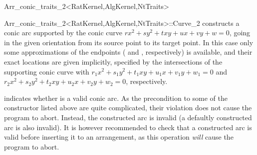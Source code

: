 \begin{ccRefClass}{Arr_conic_traits_2<RatKernel,AlgKernel,NtTraits>}
\begin{ccClass}{Arr_conic_traits_2<RatKernel,AlgKernel,NtTraits>::Curve_2}
    {constructs a conic arc supported by the conic curve 
     $r x^2 + s y^2 + t x y + u x + v y + w = 0$, going
     in the given orientation  from its source point to its target
     point. In this case only some approximations of the endpoints
     ( and , respectively) is available,
     and their exact locations are given implicitly, specified by the
     intersections of the supporting conic curve with 
     $r_1 x^2 + s_1 y^2 + t_1 x y + u_1 x + v_1 y + w_1 = 0$ and
     $r_2 x^2 + s_2 y^2 + t_2 x y + u_2 x + v_2 y + w_2 = 0$, respectively.
     }

\ccAccessFunctions


  {indicates whether \ccVar{} is a valid conic arc. As the precondition to
   some of the constructor listed above are quite complicated, their
   violation does not cause the program to abort. Instead, the constructed
   arc is invalid (a defaultly constructed arc is also invalid).
   It is however recommended to check that a constructed arc is valid before
   inserting it to an arrangement, as this operation {\sl will} cause the
   program to abort.}


\end{ccClass}
\end{ccRefClass}
